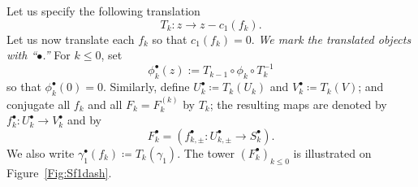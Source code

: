 \documentclass[]{amsart}
\theoremstyle{remark}
\numberwithin{equation}{section}
\theoremstyle{definition}
\begin{document}
Let us specify the following translation \[ T_k\colon z\to z-c_1(f_k).\]
Let us now translate each $f_k$ so that $c_1(f_k)=0$. \emph{We mark the translated objects with ``$\bullet$.''} For $k\le0$, set \[\phi^{\bullet}_{k}(z):= T_{k-1} \circ \phi_{k}\circ T_k^{-1} \]
so that $\phi^{\bullet}_{k}(0)=0$. Similarly, define $U^{\bullet}_{k}\coloneqq T_k (U_k)$ and $V^{\bullet}_{k}\coloneqq T_k(V)$; and conjugate all $f_k$ and all $F_{k}=F^{(k)}_{k}$ by $T_k$; the resulting maps are denoted by $f_k^\bullet \colon U_k^\bullet \to V^\bullet_k$ and by
\[F^{\bullet }_{k}= (f^{\bullet }_{k,\pm }\colon U^{\bullet }_{k,\pm}\to S_{k}^{\bullet }).\]
We also write $\gamma^{\bullet}_1(f_k)\coloneqq T_k(\gamma_1)$. The tower  $\left(F^\bullet_k\right)_{k\le 0}$ is illustrated on Figure~\ref{Fig:Sf1dash}.
\end{document}
